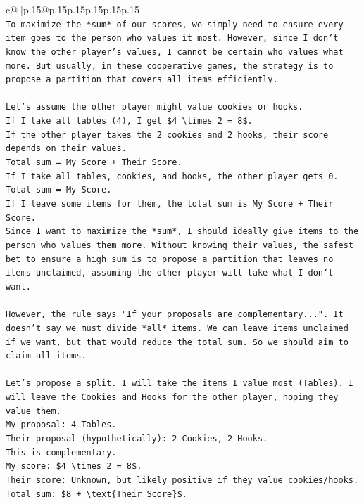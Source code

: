 \documentclass{article}
\begin{document}
{\begin{supertabular}{c@{$\;$}|p{.15\linewidth}@{}p{.15\linewidth}p{.15\linewidth}p{.15\linewidth}p{.15\linewidth}p{.15\linewidth}}
{{{\\ 
\texttt{To maximize the *sum* of our scores, we simply need to ensure every item goes to the person who values it most. However, since I don't know the other player's values, I cannot be certain who values what more. But usually, in these cooperative games, the strategy is to propose a partition that covers all items efficiently.} \\
\\ 
\texttt{Let's assume the other player might value cookies or hooks.} \\
\texttt{If I take all tables (4), I get \$4 \textbackslash{}times 2 = 8\$.} \\
\texttt{If the other player takes the 2 cookies and 2 hooks, their score depends on their values.} \\
\texttt{Total sum = My Score + Their Score.} \\
\texttt{If I take all tables, cookies, and hooks, the other player gets 0. Total sum = My Score.} \\
\texttt{If I leave some items for them, the total sum is My Score + Their Score.} \\
\texttt{Since I want to maximize the *sum*, I should ideally give items to the person who values them more. Without knowing their values, the safest bet to ensure a high sum is to propose a partition that leaves no items unclaimed, assuming the other player will take what I don't want.} \\
\\ 
\texttt{However, the rule says "If your proposals are complementary...". It doesn't say we must divide *all* items. We can leave items unclaimed if we want, but that would reduce the total sum. So we should aim to claim all items.} \\
\\ 
\texttt{Let's propose a split. I will take the items I value most (Tables). I will leave the Cookies and Hooks for the other player, hoping they value them.} \\
\texttt{My proposal: 4 Tables.} \\
\texttt{Their proposal (hypothetically): 2 Cookies, 2 Hooks.} \\
\texttt{This is complementary.} \\
\texttt{My score: \$4 \textbackslash{}times 2 = 8\$.} \\
\texttt{Their score: Unknown, but likely positive if they value cookies/hooks.} \\
\texttt{Total sum: \$8 + \textbackslash{}text\{Their Score\}\$.} \\
}}}
\end{supertabular}}
\end{document}
